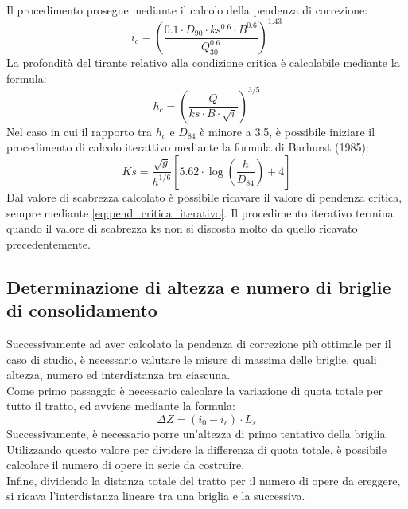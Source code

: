 Il procedimento prosegue mediante il calcolo della pendenza di correzione:
\begin{equation}
    i_c = \left(\frac{0.1 \cdot D_{90} \cdot ks^{0.6} \cdot B^{0.6}}{Q^{0.6}_{30}} \right) ^{1.43}
    \label{eq:pend_critica_iterativo}
\end{equation}
La profondità del tirante relativo alla condizione critica è calcolabile mediante la formula:
\begin{equation}
    h_c = \left( \frac{Q}{ks \cdot B \cdot \sqrt{i}}\right)^{3/5}
\end{equation}
Nel caso in cui il rapporto tra $h_c$ e $D_{84}$ è minore a 3.5, è possibile iniziare il procedimento di calcolo iterattivo mediante la formula di Barhurst (1985):
\begin{equation}
    Ks= \frac{\sqrt{g}}{h^{1/6}} \left[5.62 \cdot \log \left(\frac{h}{D_{84}}\right)+4\right]
    \label{eq:ks_scabrezza_barhurst}
\end{equation}
Dal valore di scabrezza calcolato è possibile ricavare il valore di pendenza critica, sempre mediante \eqref{eq:pend_critica_iterativo}. Il procedimento iterativo termina quando il valore di scabrezza ks non si discosta molto da quello ricavato precedentemente.

\subsection{Determinazione di altezza e numero di briglie di consolidamento}
Successivamente ad aver calcolato la pendenza di correzione più ottimale per il caso di studio, è necessario valutare le misure di massima delle briglie, quali altezza, numero ed interdistanza tra ciascuna.\\
Come primo passaggio è necessario calcolare la variazione di quota totale per tutto il tratto, ed avviene mediante la formula:
\begin{equation}
    \Delta Z = (i_0 - i_c) \cdot L_s
\end{equation}
Successivamente, è necessario porre un'altezza di primo tentativo della briglia. Utilizzando questo valore per dividere la differenza di quota totale, è possibile calcolare il numero di opere in serie da costruire.\\
Infine, dividendo la distanza totale del tratto per il numero di opere da ereggere, si ricava l'interdistanza lineare tra una briglia e la successiva.

